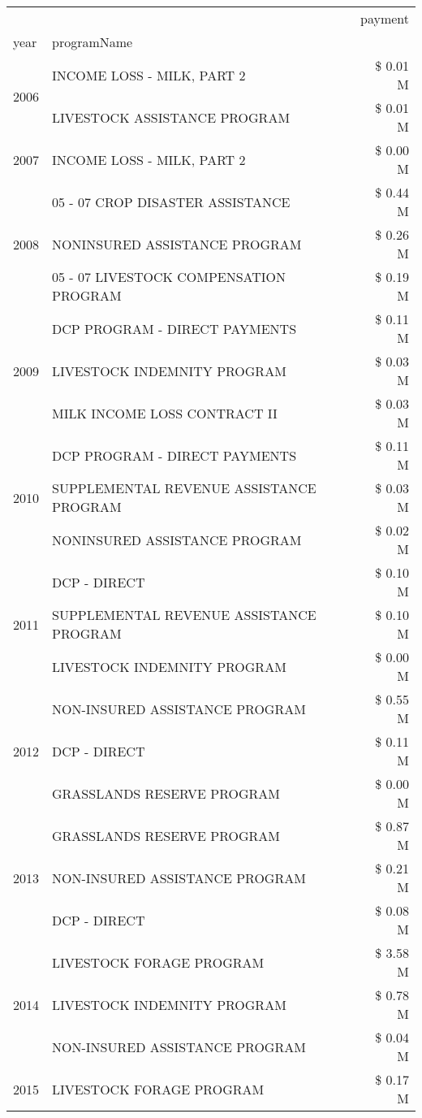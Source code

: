 \begin{tabular}{llr}
\toprule
 &  & payment \\
year & programName &  \\
\midrule
\multirow[t]{2}{*}{2006} & INCOME LOSS - MILK, PART 2 & \$ 0.01 M \\
 & LIVESTOCK ASSISTANCE PROGRAM & \$ 0.01 M \\
\cline{1-3}
2007 & INCOME LOSS - MILK, PART 2 & \$ 0.00 M \\
\cline{1-3}
\multirow[t]{3}{*}{2008} & 05 - 07 CROP DISASTER ASSISTANCE & \$ 0.44 M \\
 & NONINSURED ASSISTANCE PROGRAM & \$ 0.26 M \\
 & 05 - 07 LIVESTOCK COMPENSATION PROGRAM & \$ 0.19 M \\
\cline{1-3}
\multirow[t]{3}{*}{2009} & DCP PROGRAM - DIRECT PAYMENTS & \$ 0.11 M \\
 & LIVESTOCK INDEMNITY PROGRAM & \$ 0.03 M \\
 & MILK INCOME LOSS CONTRACT II & \$ 0.03 M \\
\cline{1-3}
\multirow[t]{3}{*}{2010} & DCP PROGRAM - DIRECT PAYMENTS & \$ 0.11 M \\
 & SUPPLEMENTAL REVENUE ASSISTANCE PROGRAM & \$ 0.03 M \\
 & NONINSURED ASSISTANCE PROGRAM & \$ 0.02 M \\
\cline{1-3}
\multirow[t]{3}{*}{2011} & DCP - DIRECT & \$ 0.10 M \\
 & SUPPLEMENTAL REVENUE ASSISTANCE PROGRAM & \$ 0.10 M \\
 & LIVESTOCK INDEMNITY PROGRAM & \$ 0.00 M \\
\cline{1-3}
\multirow[t]{3}{*}{2012} & NON-INSURED ASSISTANCE PROGRAM & \$ 0.55 M \\
 & DCP - DIRECT & \$ 0.11 M \\
 & GRASSLANDS RESERVE PROGRAM & \$ 0.00 M \\
\cline{1-3}
\multirow[t]{3}{*}{2013} & GRASSLANDS RESERVE PROGRAM & \$ 0.87 M \\
 & NON-INSURED ASSISTANCE PROGRAM & \$ 0.21 M \\
 & DCP - DIRECT & \$ 0.08 M \\
\cline{1-3}
\multirow[t]{3}{*}{2014} & LIVESTOCK FORAGE PROGRAM & \$ 3.58 M \\
 & LIVESTOCK INDEMNITY PROGRAM & \$ 0.78 M \\
 & NON-INSURED ASSISTANCE PROGRAM & \$ 0.04 M \\
\cline{1-3}
\multirow[t]{3}{*}{2015} & LIVESTOCK FORAGE PROGRAM & \$ 0.17 M \\

\end{tabular}
